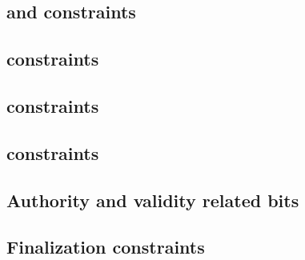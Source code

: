 \subsection{\ct{} and \maxCt{} constraints                                                            \lispTodo{}}  \label{rlp auth: generalities: ct and ct_max}                              
\subsection{\rlpAuthUtilsColumnSizeCountdown{} constraints                                            \lispTodo{}}  \label{rlp auth: generalities: byte size countdown constraints}            
\subsection{\authorityIsSenderAcc{} constraints                                                       \lispTodo{}}  \label{rlp auth: generalities: sender is authority acc}                    
\subsection{\authorityIsSenderTot{} constraints                                                       \lispTodo{}}  \label{rlp auth: generalities: sender is authority tot}                    
\subsection{Authority \macroEcrecover{} and validity related bits                                     \lispTodo{}}  \label{rlp auth: generalities: authority validity and recovery bits}       
\subsection{Finalization constraints                                                                  \lispTodo{}}  \label{rlp auth: generalities: finalization}                               



